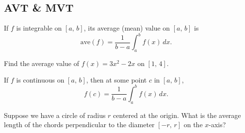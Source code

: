 \subsection*{AVT \& MVT}
\begin{tcolorbox}[title= AVERAGE VALUE OF A FUNCTION,colframe=black,sharp corners,colback=white,colbacktitle=white,coltitle=black,boxrule=1pt]

     If $f$ is integrable on $[a,\,b]$, its average (mean) value on $[a,\,b]$ is
     \[\text{ave}(f)=\frac{1}{b-a}\int_a^b f(x)\,dx.\]
    
\end{tcolorbox}
\begin{questions}
    \question Find the average value of $f(x)=3x^2-2x$ on $[1,\,4]$.
\end{questions}

\begin{tcolorbox}[title= THE MEAN VALUE THEOREM FOR DEFINITE INTEGRALS,colframe=black,sharp corners,colback=white,colbacktitle=white,coltitle=black,boxrule=1pt]

     If $f$ is continuous on $[a,\,b]$, then at some point $c$ in $[a,\,b]$,
     \[f(c)=\frac{1}{b-a}\int_a^b f(x)\,dx.\]
    
\end{tcolorbox}
\begin{questions}
    \setcounter{question}{1}
    \question Suppose we have a circle of radius $r$ centered at the origin. What is the average length of the chords perpendicular to the diameter $[-r,\,r]$ on the $x$-axis?
\end{questions}

\newpage


